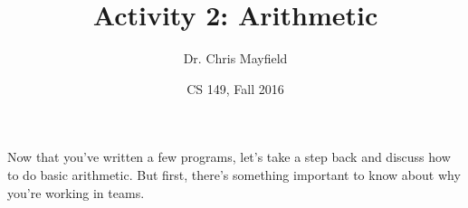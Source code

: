 \documentclass[12pt]{article}
\title{Activity 2: Arithmetic}
\author{Dr. Chris Mayfield}
\date{CS 149, Fall 2016}
\begin{document}
\maketitle

Now that you've written a few programs, let's take a step back and discuss how to do basic arithmetic.
But first, there's something important to know about why you're working in teams.





%
\end{document}
